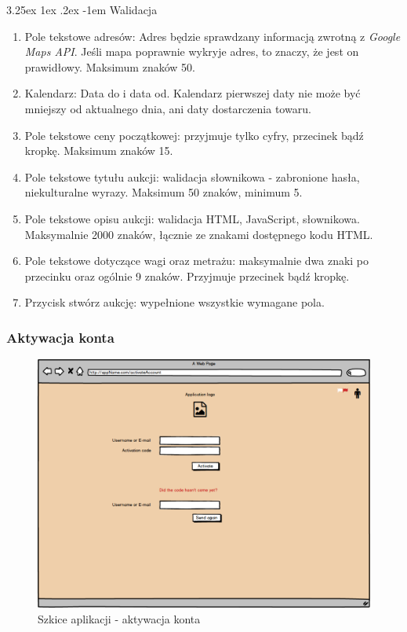 \documentclass[10pt,titlepage]{article} %
\makeatletter
\renewcommand{\normalsize}{\fontsize{8pt}{10pt}\selectfont} %
\renewcommand\paragraph{\@startsection{paragraph}{5}{\z@}%
  {3.25ex \@plus1ex \@minus.2ex}%
  {-1em}%
  {\normalfont\normalsize\bfseries}}
\makeatother
\begin{document}
\paragraph{Walidacja}\mbox{}\\
\begin{enumerate}[1.]
\item Pole tekstowe adresów: Adres będzie sprawdzany informacją zwrotną z \textit{Google Maps API}. Jeśli mapa poprawnie wykryje adres, to znaczy, że jest on prawidłowy. Maksimum znaków 50. 
\item Kalendarz: Data do i data od. Kalendarz pierwszej daty nie może być mniejszy od aktualnego dnia, ani daty dostarczenia towaru.
\item Pole tekstowe ceny początkowej: przyjmuje tylko cyfry, przecinek bądź kropkę. Maksimum znaków 15.
\item Pole tekstowe tytułu aukcji: walidacja słownikowa - zabronione hasła, niekulturalne wyrazy. Maksimum 50 znaków, minimum 5.
\item Pole tekstowe opisu aukcji: walidacja HTML, JavaScript, słownikowa. Maksymalnie 2000 znaków, łącznie ze znakami dostępnego kodu HTML.
\item Pole tekstowe dotyczące wagi oraz metrażu: maksymalnie dwa znaki po przecinku oraz ogólnie 9 znaków. Przyjmuje przecinek bądź kropkę.
\item Przycisk stwórz aukcję: wypełnione wszystkie wymagane pola.
\end{enumerate}

\subsubsection{Aktywacja konta}
\begin{figure}[H]
\includegraphics[width=\textwidth]{img/sekcja2/activateAccountMock}
\caption[Szkice aplikacji - aktywacja konta]{Szkice aplikacji - aktywacja konta}
\end{figure}
\end{document}
